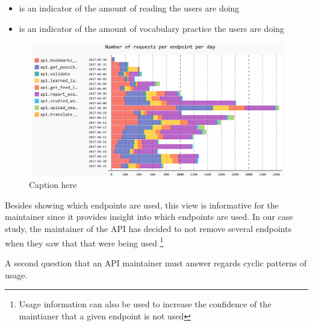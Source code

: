 \documentclass[conference]{IEEEtran}
\begin{document}
  \begin{itemize}

    \item {\color{myblue}\epTranslations} is an indicator of the amount of reading the users are doing

    \item {\color{myviolet} \epOutcome} is an indicator of the amount of vocabulary practice the users are doing

  \end{itemize}




  \begin{figure}[h!]
    \centering
    \includegraphics[width=\linewidth]{all_endpoints_usage.png}
    \caption{Caption here}
    \label{fig:aeu}
  \end{figure}

  Besides showing which endpoints are used, this view is informative for the maintainer since it provides insight into which endpoints are used. In our case study, the maintainer of the API has decided to not remove several endpoints when they saw that that were being used \footnote{Usage information can also be used to increase the confidence of the maintianer that a given endpoint is not used}

  \niceseparator

  A second question that an API maintainer must answer regards cyclic patterns of usage. 


\end{document}
